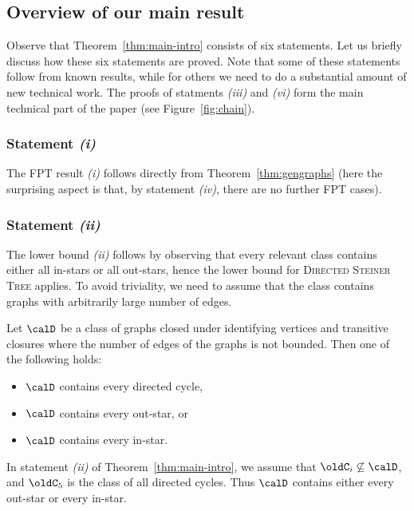  \subsection{Overview of our main result}

Observe that Theorem~\ref{thm:main-intro} consists of six statements. Let us briefly discuss how these six statements are proved. Note that some of these statements follow from known results, while for others we need to do a substantial amount of new technical work. The proofs of statments \textit{(iii)} and \textit{(vi)} form the main technical part of the paper (see Figure~\ref{fig:chain}).

\subsubsection*{Statement \textit{(i)}}
  
  The FPT result \textit{(i)} follows directly from Theorem~\ref{thm:gengraphs} (here the surprising aspect is that, by statement \textit{(iv)}, there are no further FPT cases).

\subsubsection*{Statement \textit{(ii)}}

  The lower bound \textit{(ii)} follows by observing that every relevant class contains either all in-stars or all out-stars, hence the lower bound for \textsc{Directed Steiner Tree} \cite{DBLP:conf/focs/MarxPP18} applies. To avoid triviality, we need to assume that the class contains graphs with arbitrarily large number of edges.
  \begin{lemma}\label{lem:findstar}
    Let $\calD$ be a class of graphs closed under identifying vertices and transitive closures where the number of edges of the graphs is not bounded. Then one of the following holds:
\begin{itemize}  \item $\calD$ contains every directed cycle,
  \item $\calD$ contains every out-star, or
  \item $\calD$ contains every in-star.
  \end{itemize}
\end{lemma}
In statement \textit{(ii)} of Theorem~\ref{thm:main-intro}, we assume that $\oldC_i\not\subseteq \calD$, and $\oldC_5$ is the class of all directed cycles. Thus $\calD$ contains either every out-star or every in-star.

